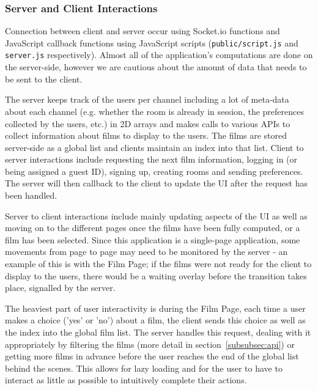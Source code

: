 \documentclass{article}
\begin{document}
\subsubsection{Server and Client Interactions}
Connection between client and server occur using Socket.io functions and JavaScript callback functions using JavaScript scripts (\texttt{public/script.js} and \texttt{server.js} respectively). Almost all of the application’s computations are done on the server-side, however we are cautious about the amount of data that needs to be sent to the client. 

The server keeps track of the users per channel including a lot of meta-data about each channel (e.g. whether the room is already in session, the preferences collected by the users, etc.) in 2D arrays and makes calls to various APIs to collect information about films to display to the users. The films are stored server-side as a global list and clients maintain an index into that list. Client to server interactions include requesting the next film information, logging in (or being assigned a guest ID), signing up, creating rooms and sending preferences. The server will then callback to the client to update the UI after the request has been handled. 

Server to client interactions include mainly updating aspects of the UI as well as moving on to the different pages once the films have been fully computed, or a film has been selected. Since this application is a single-page application, some movements from page to page may need to be monitored by the server - an example of this is with the Film Page; if the films were not ready for the client to display to the users, there would be a waiting overlay before the transition takes place, signalled by the server. 

The heaviest part of user interactivity is during the Film Page, each time a user makes a choice ('yes' or 'no') about a film, the client sends this choice as well as the index into the global film list. The server handles this request, dealing with it appropriately by filtering the films (more detail in section~\ref{subsubsec:api}) or getting more films in advance before the user reaches the end of the global list behind the scenes. This allows for lazy loading and for the user to have to interact as little as possible to intuitively complete their actions.
\end{document}

